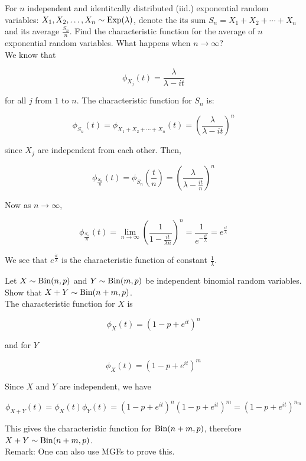 \begin{texample}
	For $n$ independent and identitcally distributed (iid.) exponential random variables: $X_1,X_2,\dots,X_n\sim\operatorname{Exp}(\lambda)$, denote the its sum $S_n=X_1+X_2+\cdots+X_n$ and its average $\frac{S_n}{n}$. Find the characteristic function for the average of $n$ exponential random variables. What happens when $n\to\infty$? \\
	
	We know that
	
	\[\phi_{X_j}(t)=\frac{\lambda}{\lambda-it}\]
	
	for all $j$ from $1$ to $n$. The characteristic function for $S_n$ is:
	
	\[\phi_{S_n}(t)=\phi_{X_1+X_2+\cdots+X_n}(t)=\left( \frac{\lambda}{\lambda-it} \right)^n\]
	
	since $X_j$ are independent from each other. Then,
	
	\[\phi_{\frac{S_n}{n}}(t)=\phi_{S_n}\left(\frac{t}{n}\right)=\left( \frac{\lambda}{\lambda-\frac{it}{n}} \right)^n\]
	
	Now as $n\to\infty$,
	
	\[\phi_{\frac{S_n}{n}}(t)=\lim_{n\to\infty} \left( \frac{1}{1-\frac{it}{\lambda n}} \right)^n=\frac{1}{e^{-\frac{it}{\lambda}}}=e^{\frac{it}{\lambda}}\]
	
	We see that $e^{\frac{it}{\lambda}}$ is the characteristic function of constant $\frac{1}{\lambda}$.
\end{texample}

\begin{texample}
	Let $X\sim\operatorname{Bin}(n,p)$ and $Y\sim\operatorname{Bin}(m,p)$ be independent binomial random variables. Show that $X+Y\sim\operatorname{Bin}(n+m,p)$. \\
	
	The characteristic function for $X$ is
	
	\[\phi_X(t)=(1-p+e^{it})^n\]
	
	and for $Y$
	
	\[\phi_X(t)=(1-p+e^{it})^m\]
	
	Since $X$ and $Y$ are independent, we have
	
	\[\phi_{X+Y}(t)=\phi_X(t)\phi_Y(t)=(1-p+e^{it})^n(1-p+e^{it})^m=(1-p+e^{it})^{n_m}\]
	
	This gives the characteristic function for $\operatorname{Bin}(n+m,p)$, therefore $X+Y\sim\operatorname{Bin}(n+m,p)$. \\
	
	Remark: One can also use MGFs to prove this.
\end{texample}

